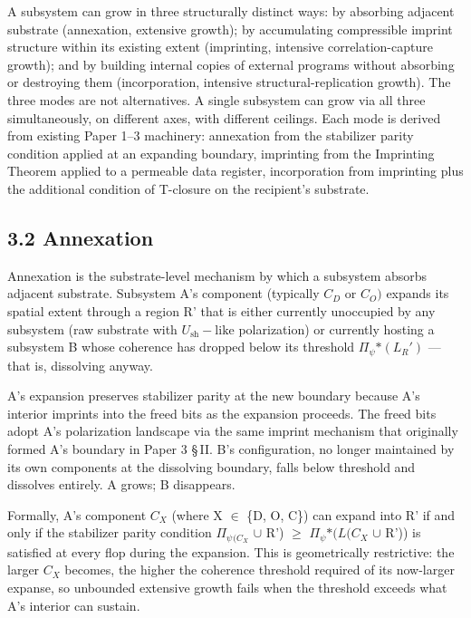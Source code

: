 \documentclass[11pt,oneside]{report}
\theoremstyle{definition}
\theoremstyle{remark}
\begin{document}
A subsystem can grow in three structurally distinct ways: by absorbing
adjacent substrate (annexation, extensive growth); by accumulating
compressible imprint structure within its existing extent (imprinting,
intensive correlation-capture growth); and by building internal copies
of external programs without absorbing or destroying them
(incorporation, intensive structural-replication growth). The three
modes are not alternatives. A single subsystem can grow via all three
simultaneously, on different axes, with different ceilings. Each mode is
derived from existing Paper 1--3 machinery: annexation from the
stabilizer parity condition applied at an expanding boundary, imprinting
from the Imprinting Theorem applied to a permeable data register,
incorporation from imprinting plus the additional condition of T-closure
on the recipient's substrate.

\subsection*{3.2 Annexation}

Annexation is the substrate-level mechanism by which a subsystem absorbs
adjacent substrate. Subsystem A's component (typically \ensuremath{C_{D}} or \ensuremath{C_{O})}
expands its spatial extent through a region R' that is either currently
unoccupied by any subsystem (raw substrate with \ensuremath{U_{\mathrm{sh}}-\text{like}} polarization)
or currently hosting a subsystem B whose coherence has dropped below its
threshold \textbar \ensuremath{\Pi_{\psi}}\textbar\ensuremath{*(L_{R}')} --- that is, dissolving anyway.

A's expansion preserves stabilizer parity at the new boundary because
A's interior imprints into the freed bits as the expansion proceeds. The
freed bits adopt A's polarization landscape via the same imprint
mechanism that originally formed A's boundary in Paper 3 \S\,II. B's
configuration, no longer maintained by its own components at the
dissolving boundary, falls below threshold and dissolves entirely. A
grows; B disappears.

Formally, A's component \ensuremath{C_{X}} (where X \ensuremath{\in} \{D, O, C\}) can expand into R'
if and only if the stabilizer parity condition
\textbar \ensuremath{\Pi_{\psi}}\textbar\ensuremath{_{(C_{X}}} \ensuremath{\cup} R') \ensuremath{\geq} \textbar \ensuremath{\Pi_{\psi}}\textbar\ensuremath{*(L(C_{X}} \ensuremath{\cup}
R')) is satisfied at every flop during the expansion. This is
geometrically restrictive: the larger \ensuremath{C_{X}} becomes, the higher the
coherence threshold required of its now-larger expanse, so unbounded
extensive growth fails when the threshold exceeds what A's interior can
sustain.
\end{document}
